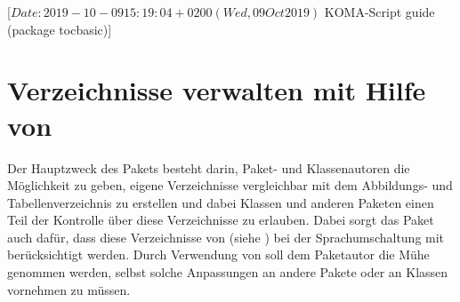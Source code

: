 %
%
%
%
%
%
%
%
% 
%
%
%
%

                 [$Date: 2019-10-09 15:19:04 +0200 (Wed, 09 Oct 2019) $
                  KOMA-Script guide (package tocbasic)]

\chapter{Verzeichnisse verwalten mit Hilfe von }

\BeginIndexGroup
{}%
%
%
Der Hauptzweck des Pakets  besteht darin, Paket- und
Klassenautoren die Möglichkeit zu geben, eigene Verzeichnisse vergleichbar mit
dem Abbildungs- und Tabellenverzeichnis zu erstellen und dabei Klassen und
anderen Paketen einen Teil der Kontrolle über diese Verzeichnisse zu
erlauben. Dabei sorgt das Paket  auch dafür, dass diese
Verzeichnisse von  (siehe
\cite{package:babel}) bei der Sprachumschaltung mit berücksichtigt
werden. Durch Verwendung von  soll dem Paketautor die Mühe
genommen werden, selbst solche Anpassungen an andere Pakete oder an Klassen
vornehmen zu müssen.


